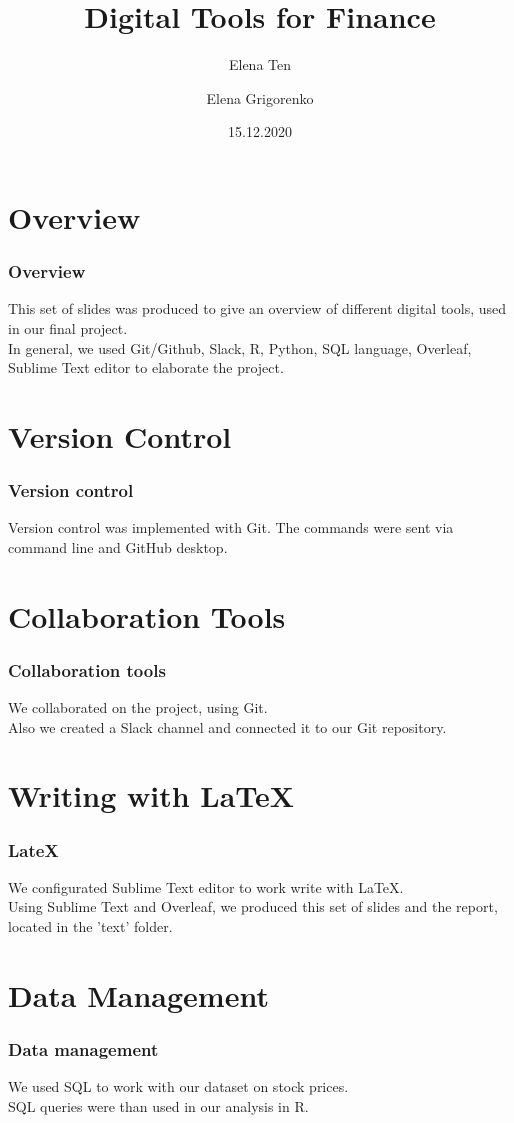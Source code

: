 \documentclass {beamer}
\title{Digital Tools for Finance}
\author [Ten, Grigorenko] {Elena Ten \and Elena Grigorenko}
\institute [UZH] {University of Zurich}
\date {15.12.2020}
\begin{document}
\frame{\titlepage}

\section{Overview}
\begin{frame}
\frametitle{Overview}
This set of slides was produced to give an overview of different digital tools, used in our final project.\\
In general, we used Git/Github, Slack, R, Python, SQL language, Overleaf, Sublime Text editor to elaborate the project. 

\end{frame}



\section{Version Control}
\begin{frame}
\frametitle{Version control}
Version control was implemented with Git. The commands were sent via command line and GitHub desktop.

\end{frame}


\section{Collaboration Tools}
\begin{frame}
\frametitle{Collaboration tools}
We collaborated on the project, using Git.\\
Also we created a Slack channel and connected it to our Git repository.

\end{frame}


\section{Writing with LaTeX}
\begin{frame}
\frametitle{LateX}
We configurated Sublime Text editor to work write with LaTeX.\\
Using Sublime Text and Overleaf, we produced this set of slides and the report, located in the 'text' folder.


\end{frame}

\section{Data Management}
\begin{frame}
\frametitle{Data management}
We used SQL to work with our dataset on stock prices.\\
SQL queries were than used in our analysis in R.

\end{frame}
\end{document}
